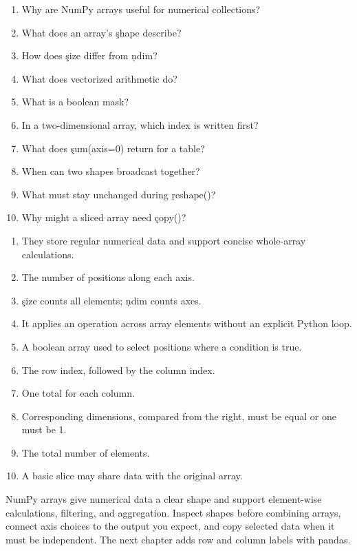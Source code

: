
\begin{enumerate}
    \item Why are NumPy arrays useful for numerical collections?
    \item What does an array's \c{shape} describe?
    \item How does \c{size} differ from \c{ndim}?
    \item What does vectorized arithmetic do?
    \item What is a boolean mask?
    \item In a two-dimensional array, which index is written first?
    \item What does \c{sum(axis=0)} return for a table?
    \item When can two shapes broadcast together?
    \item What must stay unchanged during \c{reshape()}?
    \item Why might a sliced array need \c{copy()}?
\end{enumerate}


\begin{enumerate}
    \item They store regular numerical data and support concise whole-array calculations.
    \item The number of positions along each axis.
    \item \c{size} counts all elements; \c{ndim} counts axes.
    \item It applies an operation across array elements without an explicit Python loop.
    \item A boolean array used to select positions where a condition is true.
    \item The row index, followed by the column index.
    \item One total for each column.
    \item Corresponding dimensions, compared from the right, must be equal or one must be 1.
    \item The total number of elements.
    \item A basic slice may share data with the original array.
\end{enumerate}

\begin{tcolorbox}[title=Chapter summary,colframe=orange,colback=white,arc=2mm]
NumPy arrays give numerical data a clear shape and support element-wise
calculations, filtering, and aggregation. Inspect shapes before combining
arrays, connect axis choices to the output you expect, and copy selected data
when it must be independent. The next chapter adds row and column labels with
pandas.
\end{tcolorbox}

